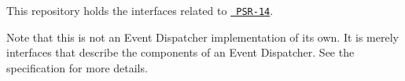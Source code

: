This repository holds the interfaces related to \href{http://www.php-fig.org/psr/psr-14/}{\texttt{ PSR-\/14}}.

Note that this is not an Event Dispatcher implementation of its own. It is merely interfaces that describe the components of an Event Dispatcher. See the specification for more details. 